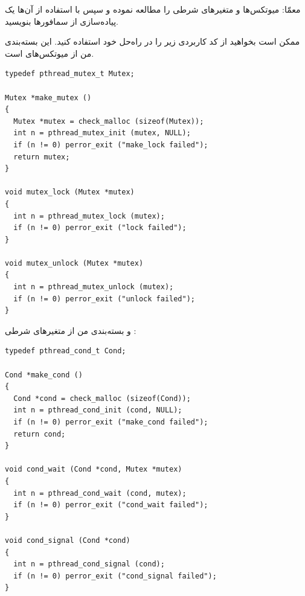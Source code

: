 \documentclass{book}
\newcommand{\clearemptydoublepage}{\newpage\cleardoublepage}
\begin{document}
    معمّا: میوتکس‌ها و متغیرهای شرطی را مطالعه نموده و سپس با استفاده از آن‌ها یک پیاده‌سازی از سمافورها بنویسید. 

    ممکن است بخواهید از کد کاربردی زیر را در راه‌حل خود استفاده کنید. 
    این بسته‌بندی من از میوتکس‌های  است.

\begin{latin}
\begin{lstlisting}
typedef pthread_mutex_t Mutex;

Mutex *make_mutex ()
{
  Mutex *mutex = check_malloc (sizeof(Mutex));
  int n = pthread_mutex_init (mutex, NULL);
  if (n != 0) perror_exit ("make_lock failed"); 
  return mutex;
}

void mutex_lock (Mutex *mutex)
{
  int n = pthread_mutex_lock (mutex);
  if (n != 0) perror_exit ("lock failed");
}

void mutex_unlock (Mutex *mutex)
{
  int n = pthread_mutex_unlock (mutex);
  if (n != 0) perror_exit ("unlock failed");
}
\end{lstlisting}
\end{latin}

\newpage
    و بسته‌بندی من از متغیرهای شرطی :


\begin{latin}
\begin{lstlisting}
typedef pthread_cond_t Cond;

Cond *make_cond ()
{
  Cond *cond = check_malloc (sizeof(Cond)); 
  int n = pthread_cond_init (cond, NULL);
  if (n != 0) perror_exit ("make_cond failed");
  return cond;
}

void cond_wait (Cond *cond, Mutex *mutex)
{
  int n = pthread_cond_wait (cond, mutex);
  if (n != 0) perror_exit ("cond_wait failed");
}

void cond_signal (Cond *cond)
{
  int n = pthread_cond_signal (cond);
  if (n != 0) perror_exit ("cond_signal failed");
}
\end{lstlisting}
\end{latin}



\clearemptydoublepage
\end{document}
